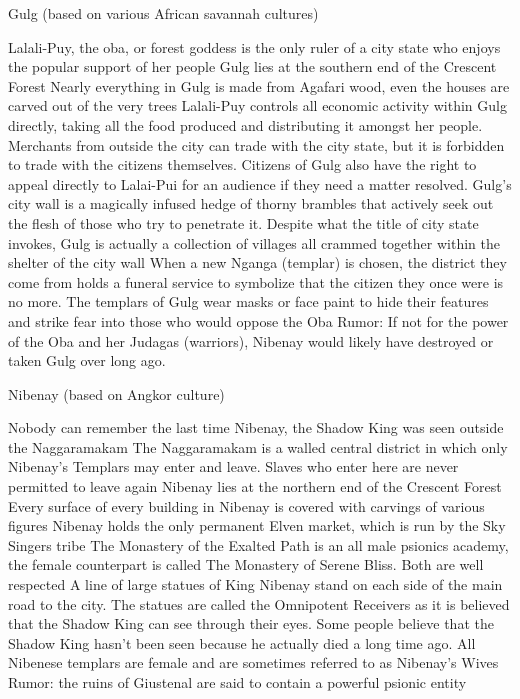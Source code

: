Gulg (based on various African savannah cultures)

    Lalali-Puy, the oba, or forest goddess is the only ruler of a city state who enjoys the popular support of her people
    Gulg lies at the southern end of the Crescent Forest
    Nearly everything in Gulg is made from Agafari wood, even the houses are carved out of the very trees
    Lalali-Puy controls all economic activity within Gulg directly, taking all the food produced and distributing it amongst her people. Merchants from outside the city can trade with the city state, but it is forbidden to trade with the citizens themselves.
    Citizens of Gulg also have the right to appeal directly to Lalai-Pui for an audience if they need a matter resolved.
    Gulg’s city wall is a magically infused hedge of thorny brambles that actively seek out the flesh of those who try to penetrate it.
    Despite what the title of city state invokes, Gulg is actually a collection of villages all crammed together within the shelter of the city wall
    When a new Nganga (templar) is chosen, the district they come from holds a funeral service to symbolize that the citizen they once were is no more.
    The templars of Gulg wear masks or face paint to hide their features and strike fear into those who would oppose the Oba
    Rumor: If not for the power of the Oba and her Judagas (warriors), Nibenay would likely have destroyed or taken Gulg over long ago.

Nibenay (based on Angkor culture)

    Nobody can remember the last time Nibenay, the Shadow King was seen outside the Naggaramakam
    The Naggaramakam is a walled central district in which only Nibenay’s Templars may enter and leave. Slaves who enter here are never permitted to leave again
    Nibenay lies at the northern end of the Crescent Forest
    Every surface of every building in Nibenay is covered with carvings of various figures
    Nibenay holds the only permanent Elven market, which is run by the Sky Singers tribe
    The Monastery of the Exalted Path is an all male psionics academy, the female counterpart is called The Monastery of Serene Bliss. Both are well respected
    A line of large statues of King Nibenay stand on each side of the main road to the city. The statues are called the Omnipotent Receivers as it is believed that the Shadow King can see through their eyes.
    Some people believe that the Shadow King hasn’t been seen because he actually died a long time ago.
    All Nibenese templars are female and are sometimes referred to as Nibenay’s Wives
    Rumor: the ruins of Giustenal are said to contain a powerful psionic entity

